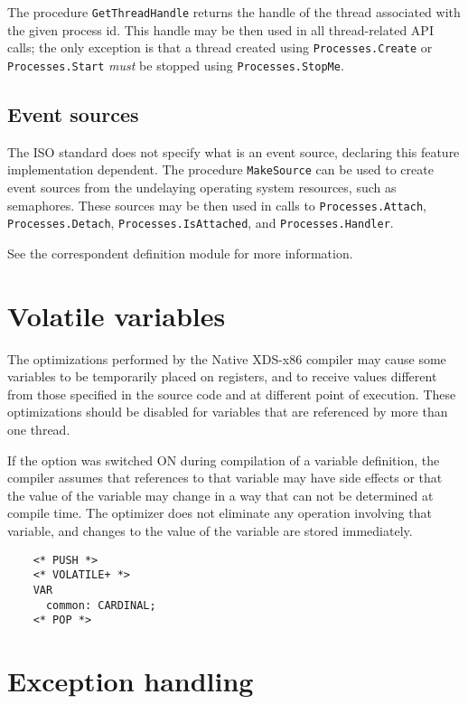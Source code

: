 The procedure \verb'GetThreadHandle' returns the handle of the thread
associated with the given process id. This handle may be then used in all
thread-related API calls; the only exception is that a thread created using
\verb'Processes.Create' or \verb'Processes.Start' {\em must} be stopped
using \verb'Processes.StopMe'.

\subsection{Event sources}

The ISO \mt{} standard does not specify what is an event source, declaring
this feature implementation dependent. The procedure \verb'MakeSource'
can be used to create event sources from the undelaying operating system
resources, such as semaphores. These sources may be then used in calls to
\verb'Processes.Attach', \verb'Processes.Detach', \verb'Processes.IsAttached',
and \verb'Processes.Handler'.

See the correspondent definition module for more information.

\section{Volatile variables}
\label{threads:volatile}

The optimizations performed by the Native XDS-x86 compiler may
cause some variables to be temporarily placed on registers, and
to receive values different from those specified in the source
code and at different point of execution. These optimizations
should be disabled for variables that are referenced by more
than one thread.

If the  option was switched ON during compilation
of a variable definition, the compiler assumes that references
to that variable may have side effects or that the value of
the variable may change in a way that can not be determined
at compile time. The optimizer does not eliminate any
operation involving that variable, and changes to the value of
the variable are stored immediately.

\begin{verbatim}
    <* PUSH *>
    <* VOLATILE+ *>
    VAR
      common: CARDINAL;
    <* POP *>
\end{verbatim}

\section{Exception handling}

